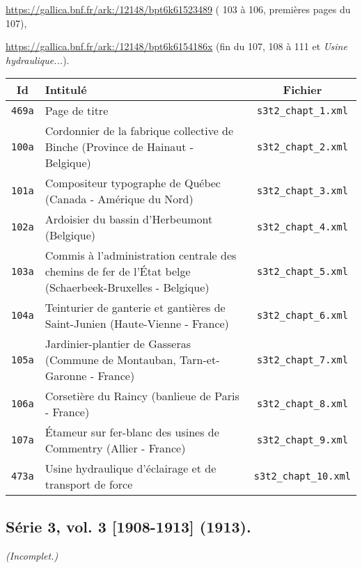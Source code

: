 \url{https://gallica.bnf.fr/ark:/12148/bpt6k61523489} (\no{} 103 à 106, premières pages du \no{} 107),

\url{https://gallica.bnf.fr/ark:/12148/bpt6k6154186x} (fin du \no{} 107, \no{} 108 à 111 et \textit{Usine hydraulique...}).


\begin{center}
\begin{longtable}{ | c | p{9.5cm} | c | }
\hline
Id & Intitulé & Fichier \\ \hline
\texttt{469a} & Page de titre & \texttt{s3t2\_chapt\_1.xml} \\ \hline
\texttt{100a} & Cordonnier de la fabrique collective de Binche (Province de Hainaut - Belgique) & \texttt{s3t2\_chapt\_2.xml} \\ \hline
\texttt{101a} & Compositeur typographe de Québec (Canada - Amérique du Nord) & \texttt{s3t2\_chapt\_3.xml} \\ \hline
\texttt{102a} & Ardoisier du bassin d'Herbeumont (Belgique) & \texttt{s3t2\_chapt\_4.xml} \\ \hline
\texttt{103a} & Commis à l'administration centrale des chemins de fer de l'État belge (Schaerbeek-Bruxelles - Belgique) & \texttt{s3t2\_chapt\_5.xml} \\ \hline
\texttt{104a} & Teinturier de ganterie et gantières de Saint-Junien (Haute-Vienne - France) & \texttt{s3t2\_chapt\_6.xml} \\ \hline
\texttt{105a} & Jardinier-plantier de Gasseras (Commune de Montauban, Tarn-et-Garonne - France) & \texttt{s3t2\_chapt\_7.xml} \\ \hline
\texttt{106a} & Corsetière du Raincy (banlieue de Paris - France) & \texttt{s3t2\_chapt\_8.xml} \\ \hline
\texttt{107a} & Étameur sur fer-blanc des usines de Commentry (Allier - France) & \texttt{s3t2\_chapt\_9.xml} \\ \hline
\texttt{473a} & Usine hydraulique d'éclairage et de transport de force & \texttt{s3t2\_chapt\_10.xml} \\ \hline
\end{longtable}
\end{center}

\newpage

\subsection{Série 3, vol. 3 [1908-1913] (1913).}
\label{mappings3t3}

\textit{(Incomplet.)}

